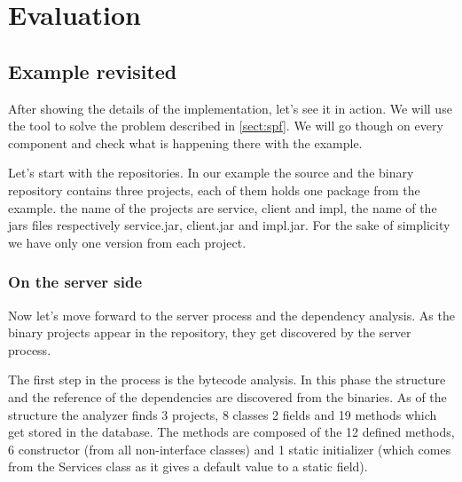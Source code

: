 \chapter{Evaluation}

\section{Example revisited}

After showing the details of the implementation, let's see it in action.
We will use the tool to solve the problem described in \autoref{sect:spf}. We
will go though on every component and check what is happening there with the
example. 

Let's start with the repositories. In our example the source and the binary
repository contains three projects, each of them holds one package from the
example. the name of the projects are service, client and impl, the name of 
the jars files respectively service.jar, client.jar and impl.jar. For the sake
of simplicity we have only one version from each project. 

\subsection{On the server side}


Now let's move forward to the server process and the dependency analysis. As 
the binary projects appear in the repository, they get discovered by the 
server process. 

The first step in the process is the bytecode analysis. In this phase the
structure and the reference of the dependencies are discovered from the
binaries. As of the structure the analyzer finds 3 projects, 8 classes 2 fields
and 19 methods which get stored in the database.
The methods are composed of the 12 defined methods, 6 constructor (from all
non-interface classes) and 1 static initializer (which comes from the Services
class as it gives a default value to a static field).


